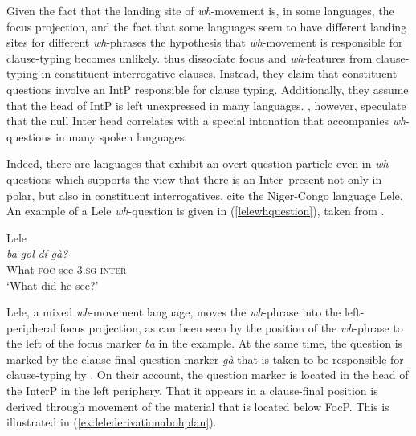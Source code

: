 \noindent Given the fact that the landing site of \textit{wh}-movement is, in some languages, the focus projection, and the fact that some languages seem to have different landing sites for different \textit{wh}-phrases the hypothesis that \textit{wh}-movement is responsible for clause-typing becomes unlikely. \citet{aboh2010sa} thus dissociate focus and \textit{wh}-features from clause-typing in constituent interrogative clauses. Instead, they claim that constituent questions involve an IntP responsible for clause typing. Additionally, they assume that the head of IntP is left unexpressed in many languages. \citet{aboh2010sa}, however, speculate that the null Inter head correlates with a special intonation that accompanies \textit{wh}-questions in many spoken languages.

Indeed, there are languages that exhibit an overt question particle even in \textit{wh}-questions which supports the view that there is an Inter\textdegree\ present not only in polar, but also in constituent interrogatives. \citet{aboh2010sa} cite the Niger-Congo language Lele. An example of a Lele \textit{wh}-question is given in (\ref{lelewhquestion}), taken from \citet[286]{frajzyngier2001grammar}.


\begin{exe}
\ex Lele \citep[286]{frajzyngier2001grammar} \\  {\textit{ba}} {\textit{gol}} {\textit{dí}} {\textit{gà?}} \\
{What} {\textsc{foc}} {see} {3.\textsc{sg}} {\textsc{inter}} \\
\trans `What did he see?' \label{lelewhquestion}
\end{exe}

\noindent Lele, a mixed \textit{wh}-movement language, moves the \textit{wh}-phrase into the left-peripheral focus projection, as can been seen by the position of the \textit{wh}-phrase to the left of the focus marker \textit{ba} in the example. At the same time, the question is marked by the clause-final question marker \textit{gà} that is taken to be responsible for clause-typing by \citet{aboh2010sa}. On their account, the question marker is located in the head of the InterP in the left periphery. That it appears in a clause-final position is derived through movement of the material that is located below FocP. This is illustrated in (\ref{ex:lelederivationabohpfau}).

